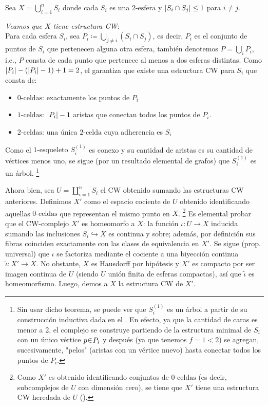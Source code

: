 \begin{sol}[Demostración]
Sea $X = \bigcup_{i=1}^n S_i$ donde cada $S_i$ es una $2\text{-esfera}$ y $\abs{S_i \cap S_j} \leq 1$ para $i\neq j$.\vspace{1em}

\emph{Veamos que $X$ tiene estructura CW}:\\
Para cada esfera $S_i$, sea $P_i \coloneqq \bigcup_{j \neq i} (S_i \cap S_j)$, es decir, $P_i$ es el conjunto de puntos de $S_i$ que pertenecen alguna otra esfera, también denotemos $P = \bigcup_iP_i$, i.e., $P$ consta de cada punto que pertenece al menos a dos esferas distintas. Como $\abs{P_i} - (\abs{P_i}-1) + 1 = 2$, el  garantiza que existe una estructura CW para $S_i$ que consta de:
\begin{itemize}[leftmargin=1.2em]
    \item $0\text{-celdas}$: exactamente los puntos de $P_i$
    \item $1\text{-celdas}$: $\abs{P_i} - 1$ aristas que conectan todos los puntos de $P_i$.%
    \item $2\text{-celdas}$: una única $2\text{-celda}$ cuya adherencia es $S_i$
\end{itemize}
Como el $1\text{-esqueleto}$ $S^{(1)}_i$ es conexo y su cantidad de aristas es su cantidad de vértices menos uno, se sigue (por un resultado elemental de grafos) que $S^{(1)}_i$ es un árbol.%
\footnote{
    Sin usar dicho teorema, se puede ver que $S^{(1)}_i$ es un árbol a partir de su construcción inductiva dada en el . En efecto, ya que la cantidad de caras es menor a 2, el complejo se construye partiendo de la estructura minimal de $S_i$ con un único vértice $p\en P_i$ y después (ya que tenemos $f=1 < 2$) se agregan, sucesivamente, "pelos" (aristas con un vértice nuevo) hasta conectar todos los puntos de $P_i$.
}

Ahora bien, sea $U = \coprod_{i=1}^n S_i$ el CW obtenido sumando las estructuras CW anteriores. Definimos $X'$ como el espacio cociente de $U$ obtenido identificando aquellas $0\text{-celdas}$ que representan el mismo punto en $X$.%
\footnote{
    Como $X'$ es obtenido identificando conjuntos de $0\text{-celdas}$ (es decir, subcomplejos de $U$ con dimensión cero), se tiene que $X'$ tiene una estructura CW heredada de $U$ (\cite[p. 8]{hatcher2002algebraic}).
}
Es elemental probar que el CW-complejo $X'$ es homeomorfo a $X$: la función $\iota: U \to X$ inducida sumando las inclusiones $S_i \hookrightarrow X$ es continua y sobre; además, por definición sus fibras coinciden exactamente con las clases de equivalencia en $X'$. Se sigue (prop. universal) que $\iota$ se factoriza mediante el cociente a una biyección continua $\tilde{\iota} \colon X' \to X$. No obstante, $X$ es Hausdorff por hipótesis y $X'$ es compacto por ser imagen continua de $U$ (siendo $U$ unión finita de esferas compactas), así que $\tilde{\iota}$ es homeomorfismo. Luego, demos a $X$ la estructura CW de $X'$.\vspace{1em}



\end{sol}
